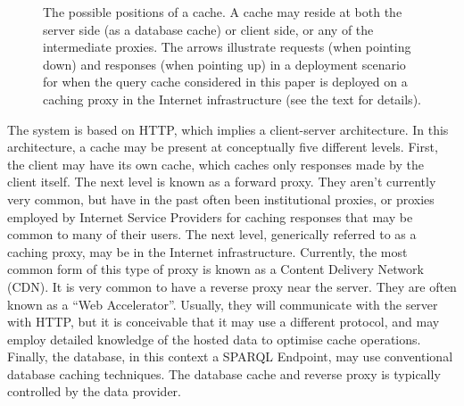 \begin{figure}
\begin{center}
\caption{The possible positions of a cache. A cache may reside at both
  the server side (as a database cache) or client side, or any of the
  intermediate proxies. The arrows illustrate requests (when pointing
  down) and responses (when pointing up) in a deployment scenario for
  when the query cache considered in this paper is deployed on a
  caching proxy in the Internet infrastructure (see the text for
  details).}\label{fig:messaging}
\end{center}
\end{figure}

The system is based on HTTP, which implies a client-server
architecture. In this architecture, a cache may be present at
conceptually five different levels. First, the client may have its own
cache, which caches only responses made by the client itself. The next
level is known as a forward proxy. They aren't currently very common,
but have in the past often been institutional proxies, or proxies
employed by Internet Service Providers for caching responses that may
be common to many of their users. The next level, generically referred
to as a caching proxy, may be in the Internet
infrastructure. Currently, the most common form of this type of proxy
is known as a Content Delivery Network (CDN). It is very common to
have a reverse proxy near the server. They are often known as a ``Web
Accelerator''. Usually, they will communicate with the server with
HTTP, but it is conceivable that it may use a different protocol, and
may employ detailed knowledge of the hosted data to optimise cache
operations. Finally, the database, in this context a SPARQL Endpoint,
may use conventional database caching techniques. The database cache
and reverse proxy is typically controlled by the data provider.

